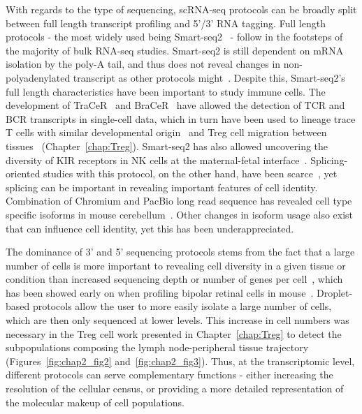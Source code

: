 With regards to the type of sequencing, scRNA-seq protocols can be broadly split between full length transcript profiling and 5'/3' RNA tagging. Full length protocols - the most widely used being Smart-seq2~\citep{picelli_full-length_2014} - follow in the footsteps of the majority of bulk RNA-seq studies. Smart-seq2 is still dependent on mRNA isolation by the poly-A tail, and thus does not reveal changes in non-polyadenylated transcript as other protocols might~\citep{hayashi_single-cell_2018,verboom_smarter_2019}. Despite this, Smart-seq2's full length characteristics have been important to study immune cells. The development of TraCeR~\citep{stubbington_t_2016} and BraCeR~\citep{lindeman_bracer:_2018} have allowed the detection of TCR and BCR transcripts in single-cell data, which in turn have been used to lineage trace T cells with similar developmental origin~\citep{lonnberg_single-cell_2017} and Treg cell migration between tissues~\citep{miragaia_single-cell_2019} (Chapter~\ref{chap:Treg}). Smart-seq2 has also allowed uncovering the diversity of KIR receptors in NK cells at the maternal-fetal interface~\citep{vento-tormo_single-cell_2018}. Splicing-oriented studies with this protocol, on the other hand, have been scarce~\citep{arzalluz-luque_single-cell_2018}, yet splicing can be important in revealing important features of cell identity. Combination of Chromium and PacBio long read sequence has revealed cell type specific isoforms in mouse cerebellum~\citep{gupta_single-cell_2018}. Other changes in isoform usage also exist that can influence cell identity, yet this has been underappreciated.

The dominance of 3' and 5' sequencing protocols stems from the fact that a large number of cells is more important to revealing cell diversity in a given tissue or condition than increased sequencing depth or number of genes per cell~\citep{svensson_quantifying_2019}, which has been showed early on when profiling bipolar retinal cells in mouse~\citep{shekhar_comprehensive_2016}. Droplet-based protocols allow the user to more easily isolate a large number of cells, which are then only sequenced at lower levels. This increase in cell numbers was necessary in the Treg cell work presented in Chapter~\ref{chap:Treg} to detect the subpopulations composing the lymph node-peripheral tissue trajectory (Figures~\ref{fig:chap2_fig2} and~\ref{fig:chap2_fig3}). Thus, at the transcriptomic level, different protocols can serve complementary functions - either increasing the resolution of the cellular census, or providing a more detailed representation of the molecular makeup of cell populations.


